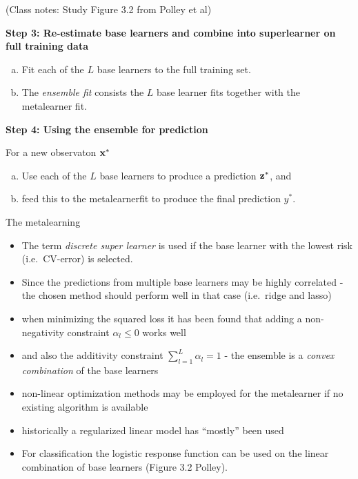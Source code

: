 \documentclass[
  ignorenonframetext,
]{beamer}
\providecommand{\tightlist}{%
  \setlength{\itemsep}{0pt}\setlength{\parskip}{0pt}}
\begin{document}
\begin{frame}

(Class notes: Study Figure 3.2 from Polley et al)

\end{frame}

\begin{frame}

\textbf{Step 3: Re-estimate base learners and combine into superlearner
on full training data}

\begin{enumerate}
[a)]
\tightlist
\item
  Fit each of the \(L\) base learners to the full training set.
\item
  The \emph{ensemble fit} consists the \(L\) base learner fits together
  with the metalearner fit.
\end{enumerate}

\textbf{Step 4: Using the ensemble for prediction}

For a new observaton \({\bf x}^*\)

\begin{enumerate}
[a)]
\tightlist
\item
  Use each of the \(L\) base learners to produce a prediction
  \({\bf z}^*\), and
\item
  feed this to the metalearnerfit to produce the final prediction
  \(y^*\).
\end{enumerate}

\end{frame}

\begin{frame}

\begin{block}{The metalearning}

\begin{itemize}
\tightlist
\item
  The term \emph{discrete super learner} is used if the base learner
  with the lowest risk (i.e.~CV-error) is selected.
\item
  Since the predictions from multiple base learners may be highly
  correlated - the chosen method should perform well in that case
  (i.e.~ridge and lasso)
\item
  when minimizing the squared loss it has been found that adding a
  non-negativity constraint \(\alpha_l\le 0\) works well
\item
  and also the additivity constraint \(\sum_{l=1}^L \alpha_l=1\) - the
  ensemble is a \emph{convex combination} of the base learners
\item
  non-linear optimization methods may be employed for the metalearner if
  no existing algorithm is available
\item
  historically a regularized linear model has ``mostly'' been used
\item
  For classification the logistic response function can be used on the
  linear combination of base learners (Figure 3.2 Polley).
\end{itemize}

\end{block}

\end{frame}
\end{document}

